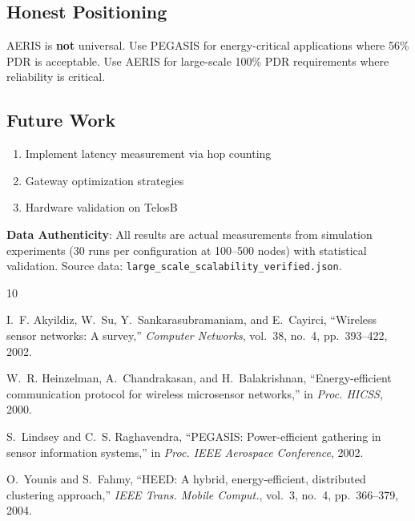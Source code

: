 \documentclass[twocolumn]{article}
\begin{document}
\subsection{Honest Positioning}

AERIS is \textbf{not} universal. Use PEGASIS for energy-critical applications
where 56\% PDR is acceptable. Use AERIS for large-scale 100\% PDR
requirements where reliability is critical.

\subsection{Future Work}

\begin{enumerate}
    \item Implement latency measurement via hop counting
    \item Gateway optimization strategies
    \item Hardware validation on TelosB
\end{enumerate}

\textbf{Data Authenticity}: All results are actual measurements from
simulation experiments (30 runs per configuration at 100--500 nodes)
with statistical validation. Source data: \texttt{large\_scale\_scalability\_verified.json}.


\begin{thebibliography}{10}

I.~F. Akyildiz, W.~Su, Y.~Sankarasubramaniam, and E.~Cayirci,
``Wireless sensor networks: A survey,''
\emph{Computer Networks}, vol.~38, no.~4, pp.~393--422, 2002.

W.~R. Heinzelman, A.~Chandrakasan, and H.~Balakrishnan,
``Energy-efficient communication protocol for wireless microsensor networks,''
in \emph{Proc. HICSS}, 2000.

S.~Lindsey and C.~S. Raghavendra,
``PEGASIS: Power-efficient gathering in sensor information systems,''
in \emph{Proc. IEEE Aerospace Conference}, 2002.

O.~Younis and S.~Fahmy,
``HEED: A hybrid, energy-efficient, distributed clustering approach,''
\emph{IEEE Trans. Mobile Comput.}, vol.~3, no.~4, pp.~366--379, 2004.

\end{thebibliography}
\end{document}
